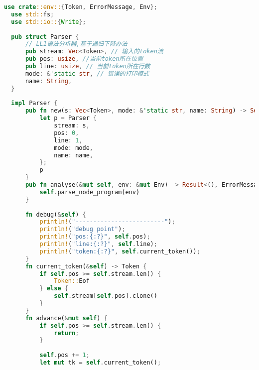 \begin{lstlisting}[caption={语法分析器parse.rs}, label={4:code-example}, captionpos=t, language=rust]
  use crate::env::{Token, ErrorMessage, Env};
  use std::fs;
  use std::io::{Write};
  
  pub struct Parser {
      // LL1语法分析器,基于递归下降办法
      pub stream: Vec<Token>, // 输入的token流
      pub pos: usize, //当前token所在位置
      pub line: usize, // 当前token所在行数
      mode: &'static str, // 错误的打印模式
      name: String,
  }
  
  impl Parser {
      pub fn new(s: Vec<Token>, mode: &'static str, name: String) -> Self {
          let p = Parser {
              stream: s,
              pos: 0,
              line: 1,
              mode: mode,
              name: name,
          };
          p
      }
      pub fn analyse(&mut self, env: &mut Env) -> Result<(), ErrorMessage> {
          self.parse_node_program(env)
      }
  
      fn debug(&self) {
          println!("-------------------------");
          println!("debug point");
          println!("pos:{:?}", self.pos);
          println!("line:{:?}", self.line);
          println!("token:{:?}", self.current_token());
      }
      fn current_token(&self) -> Token {
          if self.pos >= self.stream.len() {
              Token::Eof
          } else {
              self.stream[self.pos].clone()
          }
      }
      fn advance(&mut self) {
          if self.pos >= self.stream.len() {
              return;
          }
          
          self.pos += 1;
          let mut tk = self.current_token();
          

\end{lstlisting}
